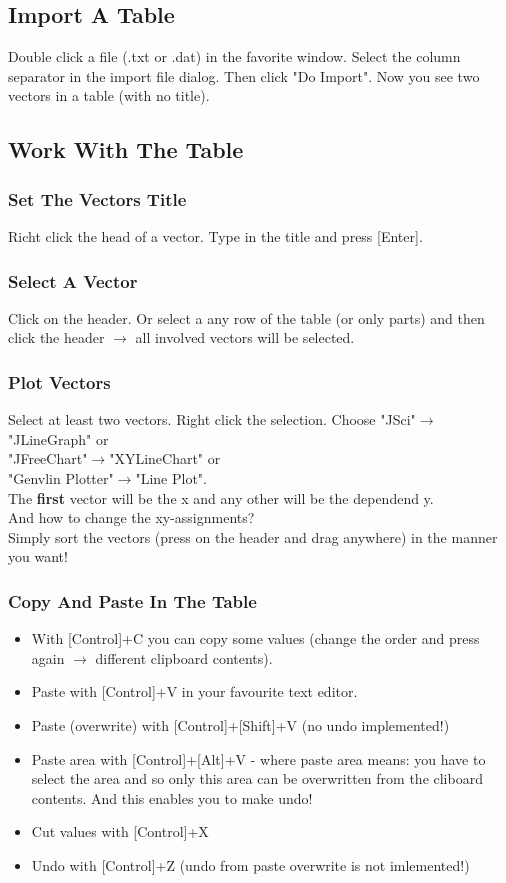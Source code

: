 \documentclass[12pt]{article}
\begin{document}
\subsection{Import A Table}
Double click a file (.txt or .dat) in the favorite window. Select the column separator in the import file dialog. Then click "Do Import". Now you see two vectors in a table (with no title).
\subsection{Work With The Table}
\subsubsection{Set The Vectors Title}
Richt click the head of a vector. Type in the title and press [Enter].
\subsubsection{Select A Vector}
Click on the header. Or select a any row of the table (or only parts) and then click the header $\rightarrow$ all involved vectors will be selected.
\subsubsection{Plot Vectors}
\label{plot}
Select at least two vectors. Right click the selection. Choose "JSci"$\rightarrow$"JLineGraph" or\\ "JFreeChart"$\rightarrow$"XYLineChart" or \\ "Genvlin Plotter"$\rightarrow$"Line Plot".\\
The {\bf first} vector will be the x and any other will be the dependend y.\\
And how to change the xy-assignments?\\ Simply sort the vectors (press on the header and drag anywhere) in the manner you want!
\subsubsection{Copy And Paste In The Table}
\begin{itemize}
\item With [Control]+C you can copy some values (change the order and press again $\rightarrow$ different clipboard contents).
\item Paste with [Control]+V in your favourite text editor. 
\item Paste (overwrite) with [Control]+[Shift]+V (no undo implemented!)
\item Paste area with [Control]+[Alt]+V - where paste area means: you have to select the area and so only this area can be overwritten from the cliboard contents. And this enables you to make undo!\\
\item Cut values with [Control]+X
\item Undo with [Control]+Z (undo from paste overwrite is not imlemented!)
\end{itemize}
\end{document}

